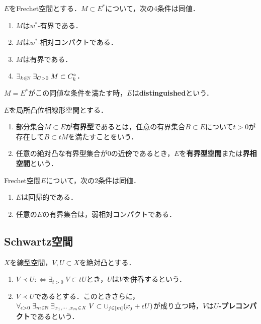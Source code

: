 \documentclass[uplatex,dvipdfmx]{jsreport}
\begin{document}
\begin{theorem}
    $E$をFrechet空間とする．$M\subset E^*$について，次の4条件は同値．
    \begin{enumerate}
        \item $M$は$w^*$-有界である．
        \item $M$は$w^*$-相対コンパクトである．
        \item $M$は有界である．
        \item $\exists_{k\in\mathbb{N}}\;\exists_{C>0}\;M\subset C^\circ_k$．
    \end{enumerate}
    $M=E^*$がこの同値な条件を満たす時，$E$は\textbf{distinguished}という．
\end{theorem}

\begin{definition}
    $E$を局所凸位相線形空間とする．
    \begin{enumerate}
        \item 部分集合$M\subset E$が\textbf{有界型}であるとは，任意の有界集合$B\subset E$について$t>0$が存在して$B\subset tM$を満たすことをいう．
        \item 任意の絶対凸な有界型集合が$0$の近傍であるとき，$E$を\textbf{有界型空間}または\textbf{界相空間}という．
    \end{enumerate}
\end{definition}

\begin{theorem}
    Frechet空間$E$について，次の2条件は同値．
    \begin{enumerate}
        \item $E$は回帰的である．
        \item 任意の$E$の有界集合は，弱相対コンパクトである．
    \end{enumerate}
\end{theorem}

\subsection{Schwartz空間}

\begin{definition}[precompact]
    $X$を線型空間，$V,U\subset X$を絶対凸とする．
    \begin{enumerate}
        \item $V\prec U:\Leftrightarrow\exists_{t>0}\;V\subset tU$とき，$U$は$V$を併呑するという．
        \item $V\prec U$であるとする．このときさらに，$\forall_{\epsilon>0}\;\exists_{m\in\mathbb{N}}\;\exists_{x_1,\cdots,x_m\in X}\;V\subset\cup_{j\in[m]}(x_j+\epsilon U)$が成り立つ時，$V$は\textbf{$U$-プレコンパクト}であるという．
    \end{enumerate}
\end{definition}
\end{document}
